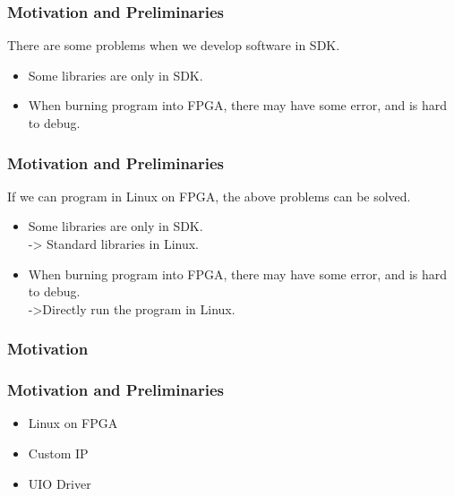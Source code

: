 \documentclass{beamer}
\begin{document}
\begin{frame}
\frametitle{\textcolor[rgb]{0.5,0.5,0.3}{Motivation} and Preliminaries}
There are some problems when we develop software in SDK.
\begin{itemize}
\item Some libraries are only in SDK.
\item When burning program into FPGA, there may have some error, and is hard to debug.
\end{itemize}
\end{frame}


\begin{frame}
\frametitle{\textcolor[rgb]{0.5,0.5,0.3}{Motivation} and Preliminaries}
If we can program in Linux on FPGA, the above problems can be solved.
\begin{itemize}
\item Some libraries are only in SDK. \\
\pause -> Standard libraries in Linux. \pause
\item When burning program into FPGA, there may have some error, and is hard to debug. \\
\pause ->Directly run the program in Linux.
\end{itemize}
\end{frame}



\begin{frame}
\frametitle{Motivation}

\end{frame}










\begin{frame}
\frametitle{\textcolor[rgb]{0.5,0.5,0.3}{Motivation} and Preliminaries}
\begin{itemize}
\item Linux on FPGA
\item Custom IP
\item UIO Driver
\end{itemize}
\end{frame}
\end{document}
